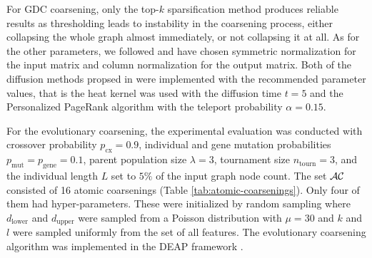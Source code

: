 For GDC coarsening, only the top-\( k \) sparsification method produces reliable results as thresholding leads to instability in the coarsening process, either collapsing the whole graph almost immediately, or not collapsing it at all. As for the other parameters, we followed \cite{gasteiger_diffusion_2019} and have chosen symmetric normalization for the input matrix and column normalization for the output matrix. Both of the diffusion methods propsed in \cite{gasteiger_diffusion_2019} were implemented with the recommended parameter values, that is the heat kernel was used with the diffusion time \( t = 5 \) and the Personalized PageRank algorithm with the teleport probability \( \alpha = 0.15 \).

For the evolutionary coarsening, the experimental evaluation was conducted with crossover probability \( p_\mathrm{cx} = 0.9 \), individual and gene mutation probabilities \( p_\mathrm{mut} = p_\mathrm{gene} = 0.1 \), parent population size \( \lambda = 3 \), tournament size \( n_\mathrm{tourn} = 3 \), and the individual length \( L \) set to \( 5\% \) of the input graph node count. The set \( \mathcal{AC} \) consisted of 16 atomic coarsenings (Table \ref{tab:atomic-coarsenings}). Only four of them had hyper-parameters. These were initialized by random sampling where \( d_\mathrm{lower} \) and \( d_\mathrm{upper} \) were sampled from a Poisson distribution with \( \mu = 30 \) and \( k \) and \( l \) were sampled uniformly from the set of all features. The evolutionary coarsening algorithm was implemented in the DEAP framework \cite{fortin_deap_2012}.

